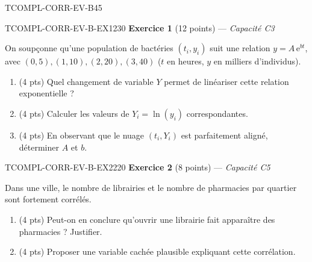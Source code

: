 

\begin{evaluation}{TCOMPL-CORR-EV-B}{45}

\begin{exercice}{TCOMPL-CORR-EV-B-EX1}{2}{30}
\textbf{Exercice 1} (12 points) --- \textit{Capacité C3}

\medskip

On soupçonne qu'une population de bactéries $(t_i,y_i)$ suit une relation $y=A\,\mathrm{e}^{bt}$, avec $(0,5),(1,10),(2,20),(3,40)$ ($t$ en heures, $y$ en milliers d'individus).
\begin{enumerate}
  \item (4 pts) Quel changement de variable $Y$ permet de linéariser cette relation exponentielle ?
  \item (4 pts) Calculer les valeurs de $Y_i=\ln(y_i)$ correspondantes.
  \item (4 pts) En observant que le nuage $(t_i,Y_i)$ est parfaitement aligné, déterminer $A$ et $b$.
\end{enumerate}
\end{exercice}

\begin{exercice}{TCOMPL-CORR-EV-B-EX2}{2}{20}
\textbf{Exercice 2} (8 points) --- \textit{Capacité C5}

\medskip

Dans une ville, le nombre de librairies et le nombre de pharmacies par quartier sont fortement corrélés.
\begin{enumerate}
  \item (4 pts) Peut-on en conclure qu'ouvrir une librairie fait apparaître des pharmacies ? Justifier.
  \item (4 pts) Proposer une variable cachée plausible expliquant cette corrélation.
\end{enumerate}
\end{exercice}

\end{evaluation}
